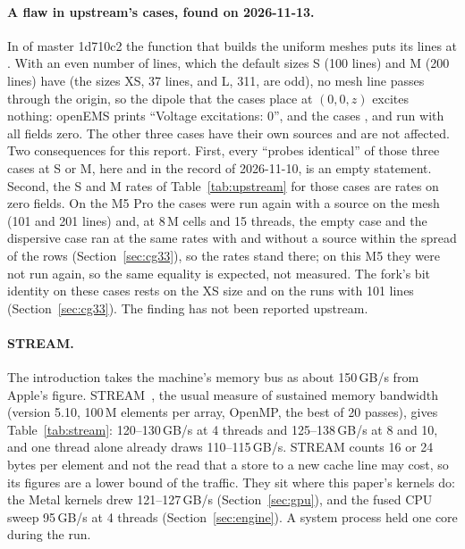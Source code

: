 \paragraph{A flaw in upstream's cases, found on 2026-11-13.} In  of master 1d710c2 the function
that builds the uniform meshes puts its lines at . With an even number of lines, which the default
sizes S (100 lines) and M (200 lines) have (the sizes XS, 37 lines, and L, 311, are odd), no mesh line passes through the
origin, so the dipole that the cases place at $(0,0,z)$ excites nothing: openEMS prints ``Voltage excitations: 0'', and the
cases ,  and  run with all fields zero. The other three cases have their own
sources and are not affected. Two consequences for this report. First, every ``probes identical'' of those three cases at
S or M, here and in the record of 2026-11-10, is an empty statement. Second, the S and M rates of Table~\ref{tab:upstream}
for those cases are rates on zero fields. On the M5 Pro the cases were run again with a source on the mesh (101 and 201
lines) and, at 8\,M cells and 15 threads, the empty case and the dispersive case ran at the same rates with and without a
source within the spread of the rows (Section~\ref{sec:cg33}), so the rates stand there; on this M5 they were not run again,
so the same equality is expected, not measured. The fork's bit identity on these cases rests on the XS size and on the runs
with 101 lines (Section~\ref{sec:cg33}). The finding has not been reported upstream.

\paragraph{STREAM.}
The introduction takes the machine's memory bus as about 150\,GB/s from Apple's figure. STREAM~\cite{stream}, the
usual measure of sustained memory bandwidth (version 5.10, 100\,M elements per array, OpenMP, the best of 20 passes),
gives Table~\ref{tab:stream}: 120--130\,GB/s at 4 threads and 125--138\,GB/s at 8 and 10, and one thread alone
already draws 110--115\,GB/s. STREAM counts 16 or 24 bytes per element and not the read that a store to a new cache
line may cost, so its figures are a lower bound of the traffic. They sit where this paper's kernels do: the Metal
kernels drew 121--127\,GB/s (Section~\ref{sec:gpu}), and the fused CPU sweep 95\,GB/s at 4 threads
(Section~\ref{sec:engine}). A system process held one core during the run.

